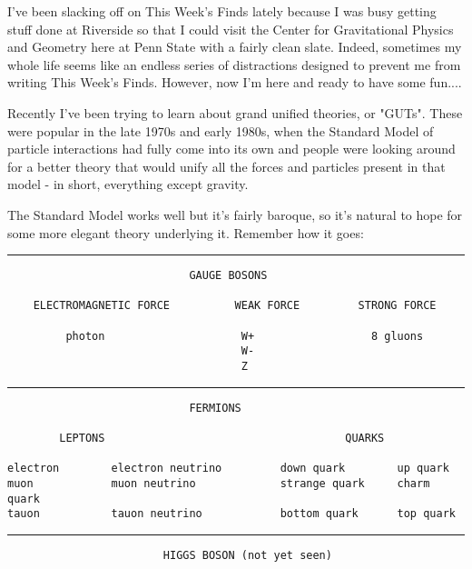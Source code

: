 

I've been slacking off on This Week's Finds lately because I was
busy getting stuff done at Riverside so that I could visit the 
Center for Gravitational Physics and Geometry here at Penn State
with a fairly clean slate.  Indeed, sometimes my whole life seems
like an endless series of distractions designed to prevent me from
writing This Week's Finds.  However, now I'm here and ready to have
some fun....

Recently I've been trying to learn about grand unified theories, or
"GUTs".  These were popular in the late 1970s and early 1980s, when
the Standard Model of particle interactions had fully come into its
own and people were looking around for a better theory that would
unify all the forces and particles present in that model - in short,
everything except gravity.  

The Standard Model works well but it's fairly baroque, so it's natural
to hope for some more elegant theory underlying it.  Remember how it
goes: 

\par\noindent\rule{\textwidth}{0.4pt}
\begin{verbatim}
                            GAUGE BOSONS
                           
    ELECTROMAGNETIC FORCE          WEAK FORCE         STRONG FORCE
        
         photon                     W+                  8 gluons 
                                    W-
                                    Z  
\end{verbatim}
    
\par\noindent\rule{\textwidth}{0.4pt}
\begin{verbatim}
                            FERMIONS

        LEPTONS                                     QUARKS

electron        electron neutrino         down quark        up quark
muon            muon neutrino             strange quark     charm quark
tauon           tauon neutrino            bottom quark      top quark
\end{verbatim}
    
\par\noindent\rule{\textwidth}{0.4pt}
\begin{verbatim}
                        HIGGS BOSON (not yet seen)

\end{verbatim}
    

